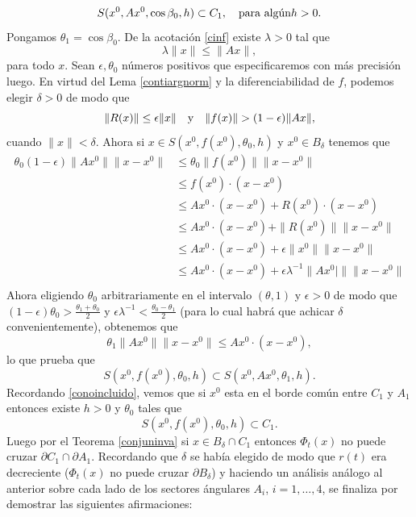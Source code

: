\begin{demo}
\begin{equation}\label{conoincluido}
    S(x^0,Ax^0,\cos\beta_0,h)\subset C_1,\quad\hbox{para algún} h>0.
\end{equation}
Pongamos $\theta_1=\cos\beta_0$. De la acotación \eqref{cinf}
existe $\lambda>0$ tal que
\[
    \lambda\|x\|\leq \|Ax\|,
\]
para todo $x$. Sean $\epsilon,\theta_0$ números positivos que
especificaremos con más precisión luego. En virtud del Lema
\ref{contiargnorm} y la diferenciabilidad de $f$, podemos elegir
$\delta>0$ de modo que
\[
\|R(x)\|\leq \epsilon\|x\|\quad\hbox{y}\quad
\|f(x)\|>(1-\epsilon)\|Ax\|,
\]
 cuando $\|x\|<\delta$. Ahora si $x\in S(x^0,f(x^0),\theta_0,h)$ y $x^0\in B_{\delta}$
  tenemos que
\[
    \begin{split}
    \theta_0(1-\epsilon)\|Ax^0\|\|x-x^0\|&\leq
    \theta_0\|f(x^0)\|\|x-x^0\|\\
    &\leq f(x^0)\cdot (x-x^0)\\
    &\leq Ax^0\cdot (x-x^0)+R(x^0)\cdot (x-x^0)\\
    &\leq Ax^0\cdot (x-x^0)+\|R(x^0)\|\|x-x^0\|\\
    &\leq Ax^0\cdot (x-x^0)+\epsilon\|x^0\|\|x-x^0\|\\
    &\leq Ax^0\cdot (x-x^0)+\epsilon\lambda^{-1}\|Ax^0|\|\|x-x^0\|\\
    \end{split}
\]
Ahora eligiendo $\theta_0$ arbitrariamente en el intervalo
$(\theta,1)$ y  $\epsilon>0$  de modo que
$(1-\epsilon)\theta_0>\frac{\theta_1+\theta_0}{2}$ y
$\epsilon\lambda^{-1}<\frac{\theta_0-\theta_1}{2}$ (para lo cual
habrá que achicar $\delta$ convenientemente), obtenemos que
\[
    \theta_1\|Ax^0\|\|x-x^0\|\leq Ax^0\cdot(x-x^0),
\]
lo que prueba que
\[
    S(x^0,f(x^0),\theta_0,h)\subset S(x^0,Ax^0,\theta_1,h).
\]
Recordando \eqref{conoincluido}, vemos que si $x^0$ esta en el
borde común entre $C_1$ y $A_1$ entonces existe $h>0$ y $\theta_0$
tales que
\begin{equation}\label{conoincluidob}
    S(x^0,f(x^0),\theta_0,h)\subset C_1.
\end{equation}
Luego por el Teorema \ref{conjuninva} si $x\in B_{\delta}\cap C_1$
entonces $\Phi_t(x)$ no puede cruzar $\partial C_1\cap\partial
A_1$. Recordando que $\delta$ se había elegido de modo que $r(t)$
era decreciente ($\Phi_t(x)$ no puede cruzar $\partial
B_{\delta}$) y haciendo un análisis análogo al anterior sobre cada
lado de los sectores ángulares $A_i$, $i=1,\ldots,4$,  se finaliza
por demostrar las siguientes afirmaciones:
\begin{enumerate}

\end{enumerate}
\end{demo}
